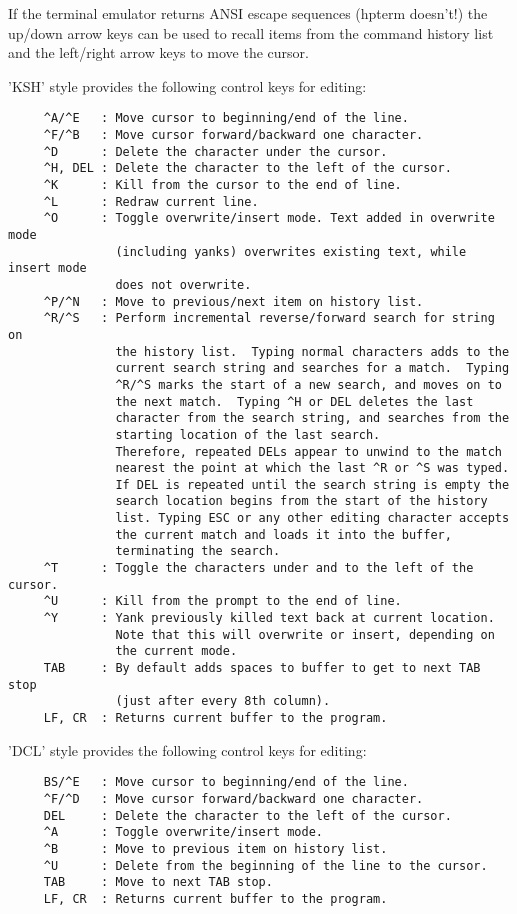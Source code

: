    \par
If the terminal emulator returns ANSI escape sequences (hpterm doesn't!) 
   the up/down arrow keys can be used to recall items from the command history 
   list and the left/right arrow keys to move the cursor.  

   \par
'KSH' style provides the following control keys for editing:  
\begin{verbatim}
     ^A/^E   : Move cursor to beginning/end of the line.
     ^F/^B   : Move cursor forward/backward one character.
     ^D      : Delete the character under the cursor.
     ^H, DEL : Delete the character to the left of the cursor.
     ^K      : Kill from the cursor to the end of line.
     ^L      : Redraw current line.
     ^O      : Toggle overwrite/insert mode. Text added in overwrite mode
               (including yanks) overwrites existing text, while insert mode
               does not overwrite.
     ^P/^N   : Move to previous/next item on history list.
     ^R/^S   : Perform incremental reverse/forward search for string on
               the history list.  Typing normal characters adds to the
               current search string and searches for a match.  Typing
               ^R/^S marks the start of a new search, and moves on to
               the next match.  Typing ^H or DEL deletes the last
               character from the search string, and searches from the
               starting location of the last search.
               Therefore, repeated DELs appear to unwind to the match
               nearest the point at which the last ^R or ^S was typed.
               If DEL is repeated until the search string is empty the
               search location begins from the start of the history
               list. Typing ESC or any other editing character accepts
               the current match and loads it into the buffer,
               terminating the search.
     ^T      : Toggle the characters under and to the left of the cursor.
     ^U      : Kill from the prompt to the end of line.
     ^Y      : Yank previously killed text back at current location.
               Note that this will overwrite or insert, depending on
               the current mode.
     TAB     : By default adds spaces to buffer to get to next TAB stop
               (just after every 8th column).
     LF, CR  : Returns current buffer to the program.
\end{verbatim}
\ENDVERB
   \par
'DCL' style provides the following control keys for editing:  
\begin{verbatim}
     BS/^E   : Move cursor to beginning/end of the line.
     ^F/^D   : Move cursor forward/backward one character.
     DEL     : Delete the character to the left of the cursor.
     ^A      : Toggle overwrite/insert mode.
     ^B      : Move to previous item on history list.
     ^U      : Delete from the beginning of the line to the cursor.
     TAB     : Move to next TAB stop.
     LF, CR  : Returns current buffer to the program.
\end{verbatim}

